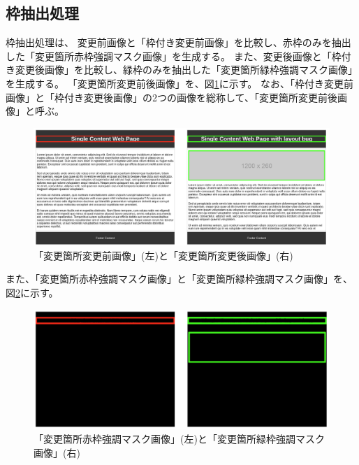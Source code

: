 
\subsection{枠抽出処理}\label{subsec:frame_extraction}
枠抽出処理は、
変更前画像と「枠付き変更前画像」を比較し、赤枠のみを抽出した「変更箇所赤枠強調マスク画像」を生成する。
また、変更後画像と「枠付き変更後画像」を比較し、緑枠のみを抽出した「変更箇所緑枠強調マスク画像」を生成する。
「変更箇所変更前後画像」を、図\ref{fig: html_waku}に示す。
なお、「枠付き変更前画像」と「枠付き変更後画像」の2つの画像を総称して、「変更箇所変更前後画像」と呼ぶ。
\begin{figure}[tp]
    \begin{center}
        \includegraphics[width=1.0\columnwidth]{image/4_html_waku.png}
        \caption{「変更箇所変更前画像」(左)と「変更箇所変更後画像」(右)}
        \label{fig: html_waku}
    \end{center}
\end{figure}
また、「変更箇所赤枠強調マスク画像」と「変更箇所緑枠強調マスク画像」を、図\ref{fig: html_diff_mask}に示す。
\begin{figure}[tp]
    \begin{center}
        \includegraphics[width=1.0\columnwidth]{image/4_html_diff_mask.png}
        \caption{「変更箇所赤枠強調マスク画像」(左)と「変更箇所緑枠強調マスク画像」(右)}
        \label{fig: html_diff_mask}
    \end{center}
\end{figure}
